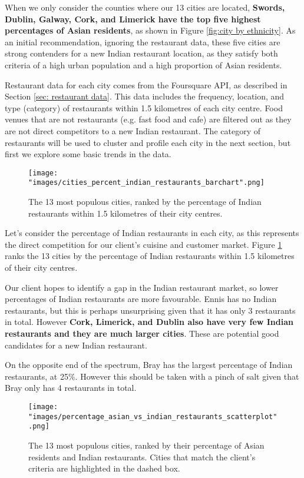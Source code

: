 \documentclass[a4paper,11pt]{article}
\begin{document}
When we only consider the counties where our 13 cities are located, \textbf{Swords, Dublin, Galway, Cork, and Limerick have the top five highest percentages of Asian residents}, as shown in Figure \ref{fig:city by ethnicity}. As an initial recommendation, ignoring the restaurant data, these five cities are strong contenders for a new Indian restaurant location, as they satisfy both criteria of a high urban population and a high proportion of Asian residents.

Restaurant data for each city comes from the Foursquare API, as described in Section \ref{sec: restaurant data}. This data includes the frequency, location, and type (category) of restaurants within 1.5 kilometres of each city centre. Food venues that are not restaurants (e.g. fast food and cafe) are filtered out as they are not direct competitors to a new Indian restaurant. The category of restaurants will be used to cluster and profile each city in the next section, but first we explore some basic trends in the data.
%
\begin{figure}[htb]
   \centering
   \texttt{[image: "images/cities\_percent\_indian\_restaurants\_barchart".png]}
      \caption{The 13 most populous cities, ranked by the percentage of Indian restaurants within 1.5 kilometres of their city centres.}
      \label{fig:city by indian restaurant}
\end{figure}
%

Let's consider the percentage of Indian restaurants in each city, as this represents the direct competition for our client's cuisine and customer market. Figure \ref{fig:city by indian restaurant} ranks the 13 cities by the percentage of Indian restaurants within 1.5 kilometres of their city centres. 

Our client hopes to identify a gap in the Indian restaurant market, so lower percentages of Indian restaurants are more favourable. Ennis has no Indian restaurants, but this is perhaps unsurprising given that it has only 3 restaurants in total. However \textbf{Cork, Limerick, and Dublin also have very few Indian restaurants and they are much larger cities}. These are potential good candidates for a new Indian restaurant.

On the opposite end of the spectrum, Bray has the largest percentage of Indian restaurants, at 25\%. However this should be taken with a pinch of salt given that Bray only has 4 restaurants in total.
%
\begin{figure}[htb]
   \centering
   \texttt{[image: "images/percentage\_asian\_vs\_indian\_restaurants\_scatterplot".png]}
      \caption{The 13 most populous cities, ranked by their percentage of Asian residents and Indian restaurants. Cities that match the client's criteria are highlighted in the dashed box.}
      \label{fig:city asian and indian}
\end{figure}
%
\end{document}
